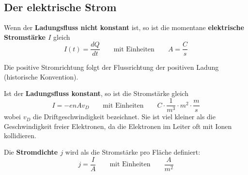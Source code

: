 \documentclass[11pt]{article}
\begin{document}
\subsection{Der elektrische Strom}

Wenn der \textbf{Ladungsfluss nicht konstant} ist, so ist die momentane \textbf{elektrische Stromstärke $I$} gleich
\begin{equation*}
	I(t) = \frac{dQ}{dt} \qquad\text{mit Einheiten}\qquad A = \frac{C}{s}
\end{equation*}

Die positive Stromrichtung folgt der Flussrichtung der positiven Ladung (historische Konvention).

Ist der \textbf{Ladungsfluss konstant}, so ist die Stromstärke gleich
\begin{equation*}
	I = -enAv_D \qquad\text{mit Einheiten}\qquad C\cdot\frac{1}{m^3}\cdot m^2\cdot\frac{m}{s}
\end{equation*}
wobei $v_D$ die Driftgeschwindigkeit bezeichnet. Sie ist viel kleiner als die Geschwindigkeit freier Elektronen, da die Elektronen im Leiter oft mit Ionen kollidieren.

Die \textbf{Stromdichte $j$} wird als die Stromstärke pro Fläche definiert:
\begin{equation*}
	j = \frac{I}{A} \qquad\text{mit Einheiten}\qquad \frac{A}{m^2}
\end{equation*}
\end{document}
